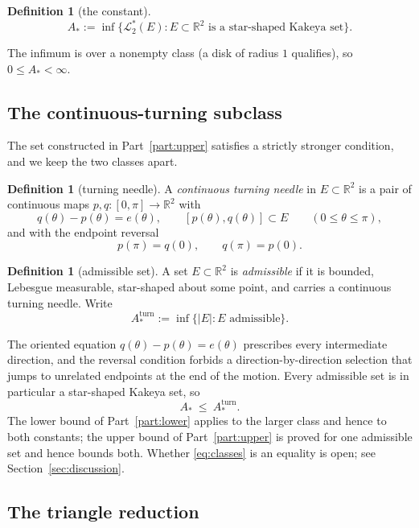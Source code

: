 \documentclass[11pt]{article}
\theoremstyle{plain}
\theoremstyle{definition}
\newtheorem{definition}[theorem]{Definition}
\theoremstyle{remark}
\newcommand{\R}{\mathbb{R}}
\newcommand{\Lout}{\mathcal{L}^{*}_{2}}
\newcommand{\Astar}{A_{*}}
\newcommand{\Aturn}{A_{*}^{\mathrm{turn}}}
\begin{document}
\begin{definition}[the constant]\label{def:Astar}
\[
  \Astar:=\inf\bigl\{\Lout(E):E\subset\R^{2}\text{ is a star-shaped Kakeya set}
  \bigr\}.
\]
\end{definition}

The infimum is over a nonempty class (a disk of radius $1$ qualifies), so
$0\le\Astar<\infty$.

\subsection{The continuous-turning subclass}

The set constructed in Part~\ref{part:upper} satisfies a strictly stronger
condition, and we keep the two classes apart.

\begin{definition}[turning needle]\label{def:turning}
A \emph{continuous turning needle} in $E\subset\R^{2}$ is a pair of continuous
maps $p,q:[0,\pi]\to\R^{2}$ with
\[
  q(\theta)-p(\theta)=e(\theta),\qquad
  [p(\theta),q(\theta)]\subset E\qquad(0\le\theta\le\pi),
\]
and with the endpoint reversal
\[
  p(\pi)=q(0),\qquad q(\pi)=p(0).
\]
\end{definition}

\begin{definition}[admissible set]\label{def:admissible}
A set $E\subset\R^{2}$ is \emph{admissible} if it is bounded, Lebesgue
measurable, star-shaped about some point, and carries a continuous turning
needle. Write
\[
  \Aturn:=\inf\{|E|:E\text{ admissible}\}.
\]
\end{definition}

The oriented equation $q(\theta)-p(\theta)=e(\theta)$ prescribes every
intermediate direction, and the reversal condition forbids a direction-by-direction
selection that jumps to unrelated endpoints at the end of the motion. Every
admissible set is in particular a star-shaped Kakeya set, so
\begin{equation}\label{eq:classes}
  \Astar\ \le\ \Aturn .
\end{equation}
The lower bound of Part~\ref{part:lower} applies to the larger class and hence
to both constants; the upper bound of Part~\ref{part:upper} is proved for one
admissible set and hence bounds both. Whether \eqref{eq:classes} is an equality
is open; see Section~\ref{sec:discussion}.

\subsection{The triangle reduction}
\end{document}
